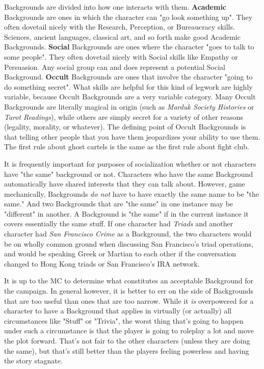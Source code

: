 Backgrounds are divided into how one interacts with them. \textbf{Academic} Backgrounds are ones in which the character can "go look something up". They often dovetail nicely with the Research, Perception, or Bureaucracy skills. Sciences, ancient languages, classical art, and so forth make good Academic Backgrounds. \textbf{Social} Backgrounds are ones where the character "goes to talk to some people". They often dovetail nicely with Social skills like Empathy or Persuasion. Any social group can and does represent a potential Social Background. \textbf{Occult} Backgrounds are ones that involve the character "going to do something secret". What skills are helpful for this kind of legwork are highly variable, because Occult Backgrounds are a very variable category. Many Occult Backgrounds are literally magical in origin (such as \textit{Marduk Society Histories} or \textit{Tarot Readings}), while others are simply secret for a variety of other reasons (legality, morality, or whatever). The defining point of Occult Backgrounds is that telling other people that you have them jeopardizes your ability to use them. The first rule about ghost cartels is the same as the first rule about fight club.

It is frequently important for purposes of socialization whether or not characters have "the same" background or not. Characters who have the same Background automatically have shared interests that they can talk about. However, game mechanically, Backgrounds \textit{do not} have to have exactly the same name to be "the same." And two Backgrounds that are "the same" in one instance may be "different" in another. A Background is "the same" if in the current instance it covers essentially the same stuff. If one character had \textit{Triads} and another character had \textit{San Francisco Crime} as a Background, the two characters would be on wholly common ground when discussing San Francisco's triad operations, and would be speaking Greek or Martian to each other if the conversation changed to Hong Kong triads or San Francisco's IRA network.

It is up to the MC to determine what constitutes an acceptable Background for the campaign. In general however, it is better to err on the side of Backgrounds that are too useful than ones that are too narrow. While it \textit{is} overpowered for a character to have a Background that applies in virtually (or actually) all circumstances like "Stuff" or "Trivia", the worst thing that's going to happen under such a circumstance is that the player is going to roleplay a lot and move the plot forward. That's not fair to the other characters (unless they are doing the same), but that's still better than the players feeling powerless and having the story stagnate.

